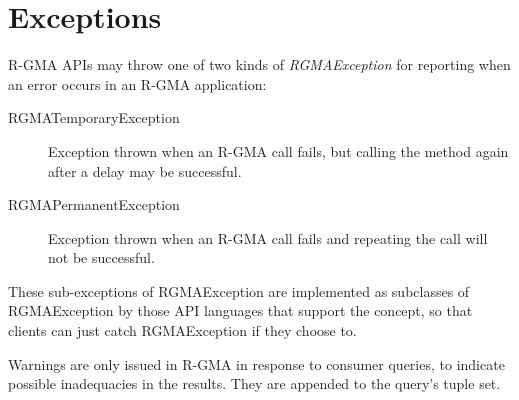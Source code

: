 \section{Exceptions}
\label{sec:exceptions}

R-GMA APIs may throw one of two kinds of \emph{RGMAException} for
reporting when an error occurs in an R-GMA application:

\begin{description}
\item[RGMATemporaryException]Exception
  thrown when an R-GMA call fails, but calling the method again after
  a delay may be successful.
\item[RGMAPermanentException]Exception thrown
  when an R-GMA call fails and repeating the call will not be
  successful.
\end{description}

These sub-exceptions of RGMAException are implemented as subclasses of
RGMAException by those API languages that support the concept, so that
clients can just catch RGMAException if they choose to.

Warnings are only issued in R-GMA in response to
consumer queries, to indicate possible inadequacies in the
results. They are appended to the query's tuple set.


